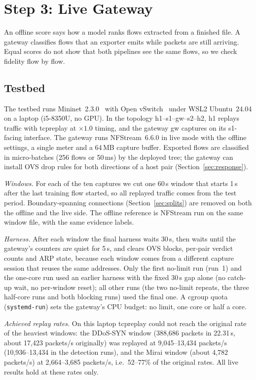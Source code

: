 \section{Step 3: Live Gateway}\label{sec:live}

An offline score says how a model ranks flows extracted from a finished file. A gateway classifies flows that an exporter emits while packets are still arriving. Equal scores do not show that both pipelines see the same flows, so we check fidelity flow by flow.

\subsection{Testbed}\label{sec:testbed}

The testbed runs Mininet~2.3.0~\cite{lantz2010mininet} with Open vSwitch~\cite{pfaff2015ovs} under WSL2 Ubuntu~24.04 on a laptop (i5-8350U, no GPU). In the topology h1--s1--gw--s2--h2, h1 replays traffic with tcpreplay at $\times1.0$ timing, and the gateway gw captures on its s1-facing interface. The gateway runs NFStream~6.6.0 in live mode with the offline settings, a single meter and a 64\,MB capture buffer. Exported flows are classified in micro-batches (256 flows or 50\,ms) by the deployed tree; the gateway can install OVS drop rules for both directions of a host pair (Section~\ref{sec:response}).

\emph{Windows.} For each of the ten captures we cut one 60\,s window that starts 1\,s after the last training flow started, so all replayed traffic comes from the test period. Boundary-spanning connections (Section~\ref{sec:splits}) are removed on both the offline and the live side. The offline reference is NFStream run on the same window file, with the same evidence labels.

\emph{Harness.} After each window the final harness waits 30\,s, then waits until the gateway's counters are quiet for 5\,s, and clears OVS blocks, per-pair verdict counts and ARP state, because each window comes from a different capture session that reuses the same addresses. Only the first no-limit run (run~1) and the one-core run used an earlier harness with the fixed 30\,s gap alone (no catch-up wait, no per-window reset); all other runs (the two no-limit repeats, the three half-core runs and both blocking runs) used the final one. A cgroup quota (\texttt{systemd-run}) sets the gateway's CPU budget: no limit, one core or half a core.

\emph{Achieved replay rates.} On this laptop tcpreplay could not reach the original rate of the heaviest windows: the DDoS-SYN window (388,686 packets in 22.31\,s, about 17,423 packets/s originally) was replayed at 9,045--13,434 packets/s (10,936--13,434 in the detection runs), and the Mirai window (about 4,782 packets/s) at 2,664--3,685 packets/s, i.e.\ 52--77\% of the original rates. All live results hold at these rates only.

